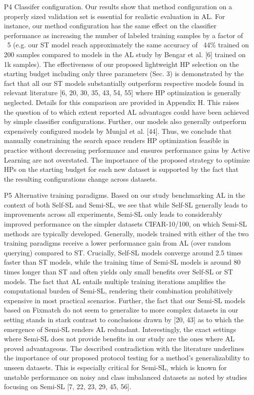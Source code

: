 \documentclass[]{article}
\begin{document}
P4 Classifer configuration. Our results show that method configuration on a properly sized validation
set is essential for realistic evaluation in AL. For instance, our method configuration has the same
effect on the classifier performance as increasing the number of labeled training samples by a factor
of ~5 (e.g. our ST model reach approximately the same accuracy of ~44\% trained on 200 samples
compared to models in the AL study by Bengar et al. [6] trained on 1k samples). The effectiveness of
our proposed lightweight HP selection on the starting budget including only three parameters (Sec. 3)
is demonstrated by the fact that all our ST models substantially outperform respective models found
in relevant literature [6, 20, 30, 35, 43, 54, 55] where HP optimization is generally neglected. Details
for this comparison are provided in Appendix H. This raises the question of to which extent reported
AL advantages could have been achieved by simple classifier configurations. Further, our models
also generally outperform expensively configured models by Munjal et al. [44]. Thus, we conclude
that manually constraining the search space renders HP optimization feasible in practice without
decreasing performance and ensures performance gains by Active Learning are not overstated. The
importance of the proposed strategy to optimize HPs on the starting budget for each new dataset is
supported by the fact that the resulting configurations change across datasets.

P5 Alternative training paradigms. Based on our study benchmarking AL in the context of
both Self-SL and Semi-SL, we see that while Self-SL generally leads to improvements across all
experiments, Semi-SL only leads to considerably improved performance on the simpler datasets
CIFAR-10/100, on which Semi-SL methods are typically developed. Generally, models trained
with either of the two training paradigms receive a lower performance gain from AL (over random
querying) compared to ST. Crucially, Self-SL models converge around 2.5 times faster than ST
models, while the training time of Semi-SL models is around 80 times longer than ST and often yields
only small benefits over Self-SL or ST models. The fact that AL entails multiple training iterations
amplifies the computational burden of Semi-SL, rendering their combination prohibitively expensive
in most practical scenarios. Further, the fact that our Semi-SL models based on Fixmatch do not seem
to generalize to more complex datasets in our setting stands in stark contrast to conclusions drawn by
[20, 43] as to which the emergence of Semi-SL renders AL redundant. Interestingly, the exact settings
where Semi-SL does not provide benefits in our study are the ones where AL proved advantageous.
The described contradiction with the literature underlines the importance of our proposed protocol
testing for a method’s generalizability to unseen datasets. This is especially critical for Semi-SL,
which is known for unstable performance on noisy and class imbalanced datasets as noted by studies
focusing on Semi-SL [7, 22, 23, 29, 45, 56].
\end{document}
